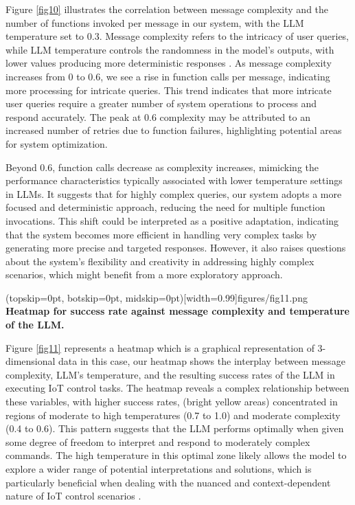 \documentclass{ieeeaccess}
\begin{document}
Figure \ref{fig10} illustrates the correlation between message complexity and the number of functions invoked per message in our system, with the LLM temperature set to 0.3. Message complexity refers to the intricacy of user queries, while LLM temperature controls the randomness in the model's outputs, with lower values producing more deterministic responses \cite{rum2024setting}. As message complexity increases from 0 to 0.6, we see a rise in function calls per message, indicating more processing for intricate queries. This trend indicates that more intricate user queries require a greater number of system operations to process and respond accurately. The peak at 0.6 complexity may be attributed to an increased number of retries due to function failures, highlighting potential areas for system optimization. 

Beyond 0.6, function calls decrease as complexity increases, mimicking the performance characteristics typically associated with lower temperature settings in LLMs. It suggests that for highly complex queries, our system adopts a more focused and deterministic approach, reducing the need for multiple function invocations. This shift could be interpreted as a positive adaptation, indicating that the system becomes more efficient in handling very complex tasks by generating more precise and targeted responses. However, it also raises questions about the system's flexibility and creativity in addressing highly complex scenarios, which might benefit from a more exploratory approach.

\Figure[t!](topskip=0pt, botskip=0pt,
midskip=0pt)[width=0.99\columnwidth]{{figures/fig11.png}}
{ \textbf{Heatmap for success rate against message complexity and temperature of the LLM.}\label{fig11}}

Figure \ref{fig11} represents a heatmap which is a graphical representation of 3-dimensional data in this case, our heatmap shows the interplay between message complexity, LLM's temperature, and the resulting success rates of the LLM in executing IoT control tasks. The heatmap reveals a complex relationship between these variables, with higher success rates, (bright yellow areas) concentrated in regions of moderate to high temperatures (0.7 to 1.0) and moderate complexity (0.4 to 0.6). This pattern suggests that the LLM performs optimally when given some degree of freedom to interpret and respond to moderately complex commands. The high temperature in this optimal zone likely allows the model to explore a wider range of potential interpretations and solutions, which is particularly beneficial when dealing with the nuanced and context-dependent nature of IoT control scenarios \cite{10315791}. 
\end{document}
